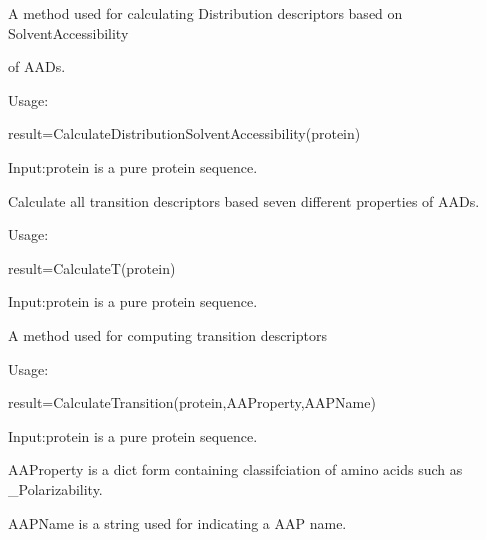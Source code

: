 \documentclass[letterpaper,10pt,english]{sphinxmanual}
\begin{document}

\begin{fulllineitems}
\label{reference/CTD:CTD.CalculateDistributionSolventAccessibility}
A method used for calculating Distribution descriptors based on SolventAccessibility

of  AADs.

Usage:

result=CalculateDistributionSolventAccessibility(protein)

Input:protein is a pure protein sequence.

\end{fulllineitems}


\begin{fulllineitems}
\label{reference/CTD:CTD.CalculateT}
Calculate all transition descriptors based seven different properties of AADs.

Usage:

result=CalculateT(protein)

Input:protein is a pure protein sequence.

\end{fulllineitems}


\begin{fulllineitems}
\label{reference/CTD:CTD.CalculateTransition}
A method used for computing transition descriptors

Usage:

result=CalculateTransition(protein,AAProperty,AAPName)

Input:protein is a pure protein sequence.

AAProperty is a dict form containing classifciation of amino acids such as \_Polarizability.

AAPName is a string used for indicating a AAP name.

\end{fulllineitems}

\end{document}
